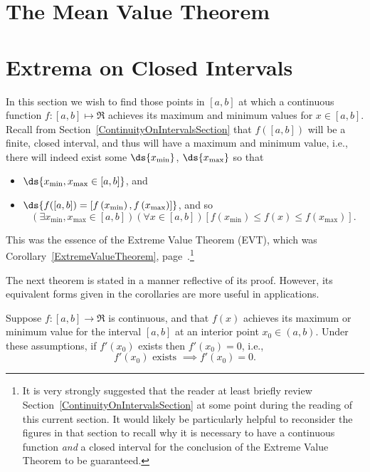 \section{The Mean Value Theorem}
\newpage
\section{Extrema on Closed Intervals\label{ExtremaOnClosedIntervals}}
In this section we wish to find those points in $[a,b]$ at which
a continuous function $f:[a,b]\mapsto\Re$ achieves its maximum
and minimum values for $x\in[a,b]$.  Recall from 
Section~\ref{ContinuityOnIntervalsSection} that $f([a,b])$ will be a
finite, closed interval, and 
thus will have a maximum and minimum value, i.e., there will
indeed exist some $\ds{x_{\text{min}}}$, $\ds{x_{\text{max}}}$ 
so that
\begin{itemize}
\item $\ds{x_{\text{min}},x_{\text{max}}\in[a,b]}$, and
\item $\ds{f([a,b])=\left[f\left(x_{\text{min}}\right),f\left(x_{\text{max}}
 \right)\right]}$, and so
\begin{equation}
\left(\exists x_{\text{min}},x_{\text{max}}\in[a,b]\right)
 (\forall x\in[a,b])\left[f\left(x_{\text{min}}\right)
   \le f(x)\le f\left(x_{\text{max}}\right)\right].
\end{equation}
\end{itemize}
This was the essence of the Extreme Value Theorem (EVT),
which was Corollary~\ref{ExtremeValueTheorem},
page~\pageref{ExtremeValueTheorem}.\footnote{%
It is very strongly suggested that the reader at least briefly review
Section~\ref{ContinuityOnIntervalsSection} at some point during the
reading of this current section.  It would likely be particularly helpful
to reconsider the figures in that section to recall why it is necessary
to have a continuous function {\it and} a closed interval for the
conclusion of the Extreme Value Theorem to be guaranteed.}

The next theorem is stated in a manner reflective of its proof.  
However, its equivalent forms given in the corollaries are more
useful in applications.  
\begin{theorem}
Suppose $f:[a,b]\longrightarrow\Re$ is continuous, and
that $f(x)$ achieves its maximum or minimum value for the interval 
$[a,b]$ at an interior point $x_0\in(a,b)$.  
Under these assumptions, if $f'(x_0)$ exists then $f'(x_0)=0$, i.e.,
$$f'(x_0) \text{ exists }\implies f'(x_0)=0.$$
\label{FirstTheoremOnInteriorExtrema}\end{theorem}

